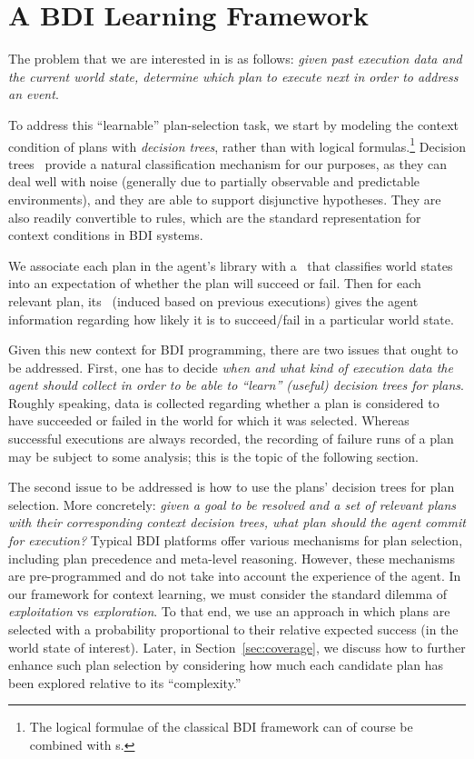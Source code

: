 \section{A BDI Learning Framework}\label{sec:framework}


The problem that we are interested in is as follows: \emph{given past execution
data and the current world state, determine which plan to execute next 
in order to address an event}.


To address this ``learnable'' plan-selection task, we start by modeling the
context condition of plans with \emph{decision trees}, rather than with logical
formulas.\footnote{The logical formulae of the classical BDI framework can of course be combined with \dt s.}
Decision trees~\cite{Mitchell97:ML}  provide a natural classification mechanism
for our purposes, as they can deal well with noise (generally due to partially
observable and predictable environments), and they are able to support
disjunctive hypotheses. They are also readily convertible to rules, which are the
standard representation for context conditions in BDI systems.


We associate each plan in the agent's library with a \dt\ that classifies world
states into an expectation of whether the plan will succeed or fail. Then for
each relevant plan, its \dt\ (induced based on previous executions)
gives the agent information regarding how likely it is to succeed/fail in a
particular world state.


Given this new context for BDI programming, there are two issues that ought to be
addressed.
First, one has to decide \emph{when and what kind of execution data the agent should
collect in order to be able to ``learn'' (useful) decision trees for plans}.
Roughly speaking, data is collected regarding whether a plan is considered to
have succeeded or failed in the world for which it was selected.
  Whereas successful executions are always recorded, the recording of failure
runs of a plan may be subject to some analysis; this is the topic of the following section.



The second issue to be addressed is how to use the plans' decision trees for plan
selection. More concretely: \emph{given a goal to be resolved and a set of
relevant plans with their corresponding context decision trees, what plan should
the agent commit for execution?}
Typical BDI platforms offer various mechanisms for plan selection, including plan
precedence and meta-level reasoning. However, these mechanisms are pre-programmed
and do not take into account the experience of the agent.
In our framework for context learning, we must consider the standard dilemma of
\emph{exploitation} vs \emph{exploration}. To that end, we use an 
approach in which plans are selected with a probability proportional to their relative expected
success (in the world state of interest). Later, in
Section~\ref{sec:coverage}, we discuss how to further enhance such plan selection
by considering how much each candidate plan has been
explored relative to its ``complexity.''



